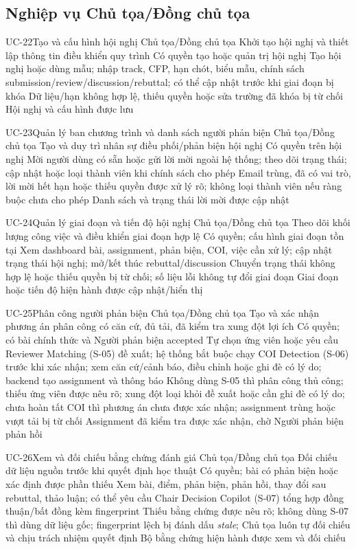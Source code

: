 \subsection{Nghiệp vụ Chủ tọa/Đồng chủ tọa}

\UseCaseSpec
{UC-22}{Tạo và cấu hình hội nghị}
{Chủ tọa/Đồng chủ tọa}
{Khởi tạo hội nghị và thiết lập thông tin điều khiển quy trình}
{Có quyền tạo hoặc quản trị hội nghị}
{Tạo hội nghị hoặc dùng mẫu; nhập track, CFP, hạn chót, biểu mẫu, chính sách submission/review/discussion/rebuttal; có thể cập nhật trước khi giai đoạn bị khóa}
{Dữ liệu/hạn không hợp lệ, thiếu quyền hoặc sửa trường đã khóa bị từ chối}
{Hội nghị và cấu hình được lưu}

\UseCaseSpec
{UC-23}{Quản lý ban chương trình và danh sách người phản biện}
{Chủ tọa/Đồng chủ tọa}
{Tạo và duy trì nhân sự điều phối/phản biện hội nghị}
{Có quyền trên hội nghị}
{Mời người dùng có sẵn hoặc gửi lời mời ngoài hệ thống; theo dõi trạng thái; cập nhật hoặc loại thành viên khi chính sách cho phép}
{Email trùng, đã có vai trò, lời mời hết hạn hoặc thiếu quyền được xử lý rõ; không loại thành viên nếu ràng buộc chưa cho phép}
{Danh sách và trạng thái lời mời được cập nhật}

\UseCaseSpec
{UC-24}{Quản lý giai đoạn và tiến độ hội nghị}
{Chủ tọa/Đồng chủ tọa}
{Theo dõi khối lượng công việc và điều khiển giai đoạn hợp lệ}
{Có quyền; cấu hình giai đoạn tồn tại}
{Xem dashboard bài, assignment, phản biện, COI, việc cần xử lý; cập nhật trạng thái hội nghị; mở/kết thúc rebuttal/discussion}
{Chuyển trạng thái không hợp lệ hoặc thiếu quyền bị từ chối; số liệu lỗi không tự đổi giai đoạn}
{Giai đoạn hoặc tiến độ hiện hành được cập nhật/hiển thị}

\UseCaseSpec
{UC-25}{Phân công người phản biện}
{Chủ tọa/Đồng chủ tọa}
{Tạo và xác nhận phương án phân công có căn cứ, đủ tải, đã kiểm tra xung đột lợi ích}
{Có quyền; có bài chính thức và Người phản biện accepted}
{Tự chọn ứng viên hoặc yêu cầu Reviewer Matching (S-05) đề xuất; hệ thống bắt buộc chạy COI Detection (S-06) trước khi xác nhận; xem căn cứ/cảnh báo, điều chỉnh hoặc ghi đè có lý do; backend tạo assignment và thông báo}
{Không dùng S-05 thì phân công thủ công; thiếu ứng viên được nêu rõ; xung đột loại khỏi đề xuất hoặc cần ghi đè có lý do; chưa hoàn tất COI thì phương án chưa được xác nhận; assignment trùng hoặc vượt tải bị từ chối}
{Assignment đã kiểm tra được xác nhận, chờ Người phản biện phản hồi}

\UseCaseSpec
{UC-26}{Xem và đối chiếu bằng chứng đánh giá}
{Chủ tọa/Đồng chủ tọa}
{Đối chiếu dữ liệu nguồn trước khi quyết định học thuật}
{Có quyền; bài có phản biện hoặc xác định được phần thiếu}
{Xem bài, điểm, phản biện, phản hồi, thay đổi sau rebuttal, thảo luận; có thể yêu cầu Chair Decision Copilot (S-07) tổng hợp đồng thuận/bất đồng kèm fingerprint}
{Thiếu bằng chứng được nêu rõ; không dùng S-07 thì dùng dữ liệu gốc; fingerprint lệch bị đánh dấu \textit{stale}; Chủ tọa luôn tự đối chiếu và chịu trách nhiệm quyết định}
{Bộ bằng chứng hiện hành được xem và đối chiếu}

